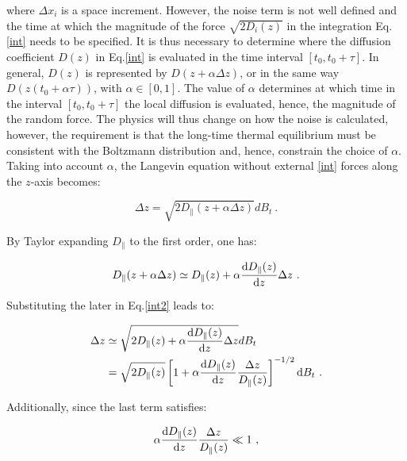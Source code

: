 where $\Delta x_i$ is a space increment. However, the noise term is not well defined and the time at which the magnitude of the force $\sqrt{2D_i(z)}$ in the integration Eq.\ref{int} needs to be specified. It is thus necessary to determine where the diffusion coefficient $D(z)$ in Eq.\ref{int} is evaluated in the time interval $[t_0, t_0 + \tau]$. In general, $D(z)$ is represented by $D(z + \alpha \Delta z)$, or in the same way $D(z(t_0 + \alpha \tau))$, with $\alpha \in [0,1]$. The value of $\alpha$ determines at which time in the interval   $[t_0, t_0 + \tau]$ the local diffusion is evaluated, hence, the magnitude of the random force. The physics will thus change on how the noise is calculated, however, the requirement is that the long-time thermal equilibrium must be consistent with the Boltzmann distribution and, hence, constrain the choice of $\alpha$. Taking into account $\alpha$, the Langevin equation without external \ref{int} forces along the $z$-axis becomes:

\begin{equation}
	\Delta z  = \sqrt{2D_\parallel (z + \alpha \Delta z)} d B_t ~.
	\label{int2}
\end{equation}

By Taylor expanding $D_ \parallel$ to the first order, one has:

\begin{equation}
	D_\parallel (z + \alpha \Delta z) \simeq D_\parallel (z)  + \alpha \frac{\textnormal{d} D_\parallel(z)}{\textnormal{d}z} \Delta z ~.
\end{equation}

Substituting the later in Eq.\ref{int2} leads to:

\begin{equation}
	\begin{aligned}
		\Delta z &\simeq \sqrt{2D_\parallel (z)  + \alpha \frac{\textnormal{d} D_\parallel(z)}{\textnormal{d}z} \Delta z} d B_t  \\
		& = \sqrt{2D_\parallel (z)} \left[1 + \alpha \frac{\textnormal{d} D_\parallel(z)}{\textnormal{d}z} \frac{\Delta z }{D_\parallel(z)}\right] ^{-1/2} \textnormal{d} B_t  ~.
	\end{aligned}
	\label{int3}
\end{equation}

Additionally, since the last term satisfies:

\begin{equation}
	\alpha \frac{\textnormal{d} D_\parallel(z)}{\textnormal{d}z} \frac{\Delta z }{D_\parallel(z)} \ll 1 ~,
\end{equation}

